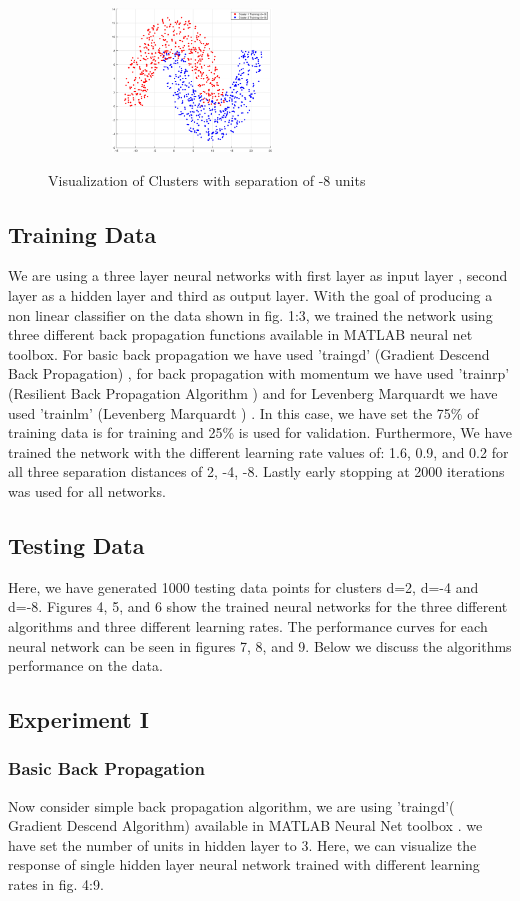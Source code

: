 \documentclass[conference]{IEEEtran}
\begin{document}
\begin{figure}[b!]
\centering
{\includegraphics[width=3in, height=1.5in,clip,keepaspectratio]{ClustersDn8.eps} }\\
\caption{ Visualization of Clusters with separation of -8 units}
\end{figure}
\subsection{Training Data}
We are using a three layer neural networks with first layer as input layer , second layer as a hidden layer and third as output layer. With the goal of producing a non linear classifier on the data shown in fig. 1:3, we trained the network using three different back propagation functions available in MATLAB neural net toolbox. For basic back propagation we have used 'traingd' (Gradient Descend Back Propagation)\cite{gd} \cite{mgd}, for back propagation with momentum we have used 'trainrp' (Resilient Back Propagation Algorithm )\cite{gdm} \cite{mgdm}and for Levenberg Marquardt we have used 'trainlm' (Levenberg Marquardt )\cite{lm} \cite{mlm}. In this case, we have set the 75\% of training data is for training and 25\% is used for validation. Furthermore, We have trained the network with the different learning rate values of: 1.6, 0.9, and 0.2  for all three separation distances of 2, -4, -8. Lastly early stopping at 2000 iterations was used for all networks.
\subsection{Testing Data}
 Here, we have generated 1000 testing data points for clusters d=2, d=-4 and d=-8. Figures 4, 5, and 6 show the trained neural networks for the three different algorithms and three different learning rates. The performance curves for each neural network can be seen in figures 7, 8, and 9. Below we discuss the algorithms performance on the data.
\subsection{Experiment I}
\subsubsection{Basic Back Propagation}
 Now consider simple back propagation algorithm, we are using 'traingd'( Gradient Descend Algorithm)\cite{mgd} available in MATLAB Neural Net toolbox \cite{bpm}. we have set the number of units in hidden layer to 3. Here, we can visualize the response of single hidden layer neural network trained with different learning rates in fig. 4:9.
\end{document}
